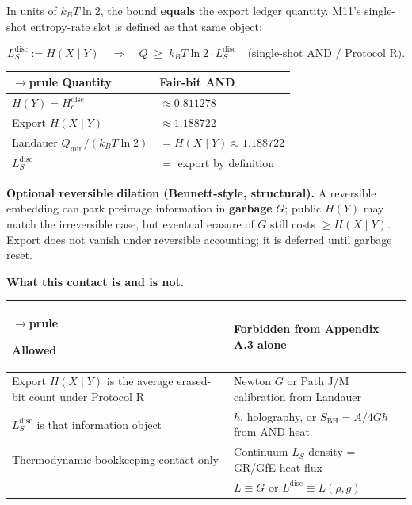 \documentclass[
  11pt,
]{article}
\newcounter{none} %
\begin{document}
In units of \(k_B T\ln 2\), the bound \textbf{equals} the export ledger quantity. M11's single-shot entropy-rate slot is defined as that same object:

\[
L_S^{\mathrm{disc}} := H(X\mid Y)
\quad\Rightarrow\quad
Q \;\ge\; k_B T \ln 2 \cdot L_S^{\mathrm{disc}}
\quad\text{(single-shot AND / Protocol R)}.
\]

{\def\LTcaptype{none} %
\begin{longtable}[]{@{}ll@{}}
$\rightarrow$prule\noalign{}
Quantity & Fair-bit AND \\
\midrule\noalign{}
\endhead
\bottomrule\noalign{}
\endlastfoot
\(H(Y)=H_c^{\mathrm{disc}}\) & \(\approx 0.811278\) \\
Export \(H(X\mid Y)\) & \(\approx 1.188722\) \\
Landauer \(Q_{\min}/(k_B T\ln 2)\) & \(=H(X\mid Y)\approx 1.188722\) \\
\(L_S^{\mathrm{disc}}\) & \(=\) export by definition \\
\end{longtable}
}

\textbf{Optional reversible dilation (Bennett-style, structural).} A reversible embedding can park preimage information in \textbf{garbage} \(G\); public \(H(Y)\) may match the irreversible case, but eventual erasure of \(G\) still costs \(\ge H(X\mid Y)\). Export does not vanish under reversible accounting; it is deferred until garbage reset.

\textbf{What this contact is and is not.}

{\def\LTcaptype{none} %
\begin{longtable}[]{@{}
  >{\raggedright\arraybackslash}p{}
  >{\raggedright\arraybackslash}p{}@{}}
$\rightarrow$prule\noalign{}
\begin{minipage}[b]{\linewidth}\raggedright
Allowed
\end{minipage} & \begin{minipage}[b]{\linewidth}\raggedright
Forbidden from Appendix A.3 alone
\end{minipage} \\
\midrule\noalign{}
\endhead
\bottomrule\noalign{}
\endlastfoot
Export \(H(X\mid Y)\) is the average erased-bit count under Protocol R & Newton \(G\) or Path J/M calibration from Landauer \\
\(L_S^{\mathrm{disc}}\) is that information object & \(\hbar\), holography, or \(S_{\mathrm{BH}}=A/4G\hbar\) from AND heat \\
Thermodynamic bookkeeping contact only & Continuum \(L_S\) density = GR/GfE heat flux \\
& \(L\equiv G\) or \(L^{\mathrm{disc}}\equiv L(\rho,g)\) \\
\end{longtable}
}
\end{document}
